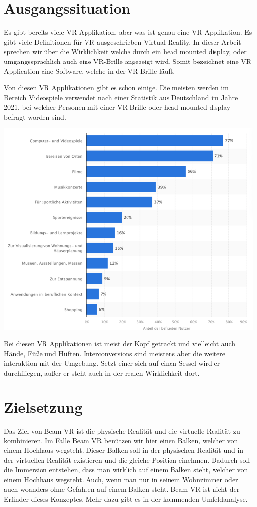 \section{Ausgangssituation}\label{sec: initial_situation}

Es gibt bereits viele VR Applikation, aber was ist genau eine VR Applikation.
Es gibt viele Definitionen für VR ausgeschrieben Virtual Reality.
In dieser Arbeit sprechen wir über die Wirklichkeit welche durch ein head mounted display, oder umgangssprachlich auch eine VR-Brille angezeigt wird.
Somit bezeichnet eine VR Application eine Software, welche in der VR-Brille läuft.

Von diesen VR Applikationen gibt es schon einige.
Die meisten werden im Bereich Videospiele verwendet nach einer Statistik aus Deutschland im Jahre 2021, bei welcher Personen mit einer VR-Brille oder head mounted display befragt worden sind.

\includegraphics[scale=0.5]{pics/statistic_anwendungsgebiete_vr}

Bei diesen VR Applikationen ist meist der Kopf getrackt und vielleicht auch Hände, Füße und Hüften.
Interconversions sind meistens aber die weitere interaktion mit der Umgebung.
Setzt einer sich auf einen Sessel wird er durchfliegen, außer er steht auch in der realen Wirklichkeit dort.

\section{Zielsetzung}\label{sec: objective}

Das Ziel von Beam VR ist die physische Realität und die virtuelle Realität zu kombinieren.
Im Falle Beam VR benützen wir hier einen Balken, welcher von einem Hochhaus wegsteht.
Dieser Balken soll in der physischen Realität und in der virtuellen Realität existieren und die gleiche Position einehmen.
Dadurch soll die Immersion entstehen, dass man wirklich auf einem Balken steht, welcher von einem Hochhaus wegsteht.
Auch, wenn man nur in seinem Wohnzimmer oder auch woanders ohne Gefahren auf einem Balken steht.
Beam VR ist nicht der Erfinder dieses Konzeptes.
Mehr dazu gibt es in der kommenden Umfeldanalyse.

